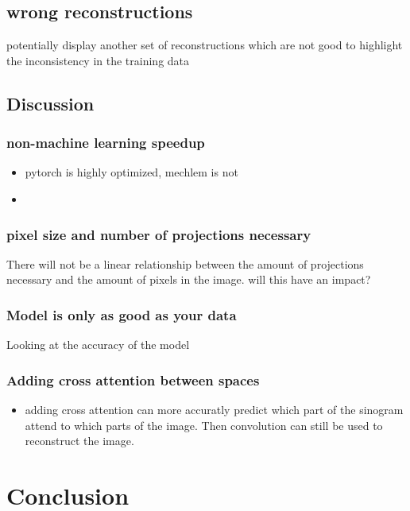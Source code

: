 \documentclass{article}
\begin{document}
\subsection{wrong reconstructions}

potentially display another set of reconstructions which are not good to highlight the inconsistency in the training data

\subsection{Discussion}

\subsubsection{non-machine learning speedup}

\begin{itemize}
\item pytorch is highly optimized, mechlem is not
\item
\end{itemize}

\subsubsection{pixel size and number of projections necessary}

There will not be a linear relationship between the amount of projections necessary and the amount of pixels in the image. will this have an impact?

\subsubsection{Model is only as good as your data}

Looking at the accuracy of the model

\subsubsection{Adding cross attention between spaces}

\begin{itemize}
\item adding cross attention can more accuratly predict which part of the sinogram attend to which parts of the image. Then convolution can still be used to reconstruct the image.
\end{itemize}

\section{Conclusion}

\clearpage

\end{document}

